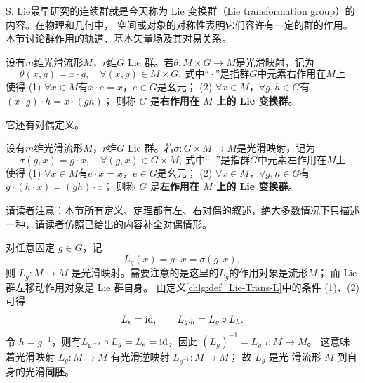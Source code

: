 S. Lie最早研究的连续群就是今天称为 Lie 变换群（Lie transformation group）的内容。在物理和几何中，
空间或对象的对称性表明它们容许有一定的群的作用。
本节讨论群作用的轨道、基本矢量场及其对易关系。

\begin{definition}
    设有$m$维光滑流形$M$，$r$维$G$ Lie 群。若$\theta:M\times G \to M$是光滑映射，记为
    \begin{equation*}
        \theta(x,g)=x\cdot g,\quad \forall(x,g)\in M\times G,
        \ \text{式中“} \cdot \text{”是指群}G\text{中元素右作用在}M \text{上}
    \end{equation*}
    使得
    (1) $\forall x\in M$有$x\cdot e=x$，$e\in G$是幺元；
    (2) $\forall x \in M$，$\forall g, h \in G$有$(x \cdot g) \cdot h=x \cdot(g h)$；
    则称 $G$ 是\textbf{右作用在 $M$ 上的 Lie 变换群}。
\end{definition}

它还有对偶定义。
\begin{definition}\label{chlg:def_Lie-Trans-L}
    设有$m$维光滑流形$M$，$r$维$G$ Lie 群。若$\sigma:G\times M \to M$是光滑映射，记为
    \begin{equation*}
        \sigma(g,x)=g\cdot x,\quad \forall(g,x)\in G\times M,
        \ \text{式中“} \cdot \text{”是指群}G\text{中元素左作用在}M \text{上}
    \end{equation*}
    使得
    (1) $\forall x \in M$有$e\cdot x=x$，$e\in G$是幺元；
    (2) $\forall x \in M$，$\forall g, h \in G$有$g\cdot (h \cdot x) =(gh)\cdot x$；
    则称 $G$ 是\textbf{左作用在 $M$ 上的 Lie 变换群}。
\end{definition}

请读者注意：本节所有定义、定理都有左、右对偶的叙述，绝大多数情况下只描述
一种，请读者仿照已给出的内容补全对偶情形。

对任意固定 $g \in G$，记
\begin{equation}
    L_g(x)=g \cdot x=\sigma( g,x),
\end{equation}
则 $L_g: M \rightarrow M$ 是光滑映射。需要注意的是这里的$L_g$的作用对象是流形$M$；
而 Lie 群左移动作用对象是 Lie 群自身。
由定义\ref{chlg:def_Lie-Trans-L}中的条件 (1)、(2) 可得
\begin{equation}\label{chlg:eqn_tmplrg}
    L_e  =\mathrm{id} , \qquad
    L_{g \cdot h}  =L_g \circ L_h .
\end{equation}
令 $h=g^{-1}$，则有$L_{g^{-1}} \circ L_{g}=L_{e}=\mathrm{id}  $，因此
$(L_{g})^{-1}=L_{g^{-1}}: M \to M $。
这意味着光滑映射 $L_{g}: M \to M$ 有光滑逆映射 $L_{g^{-1}}: M \to M$；
故 $L_{g}$ 是光 滑流形 $M$ 到自身的光滑\textbf{同胚}。

